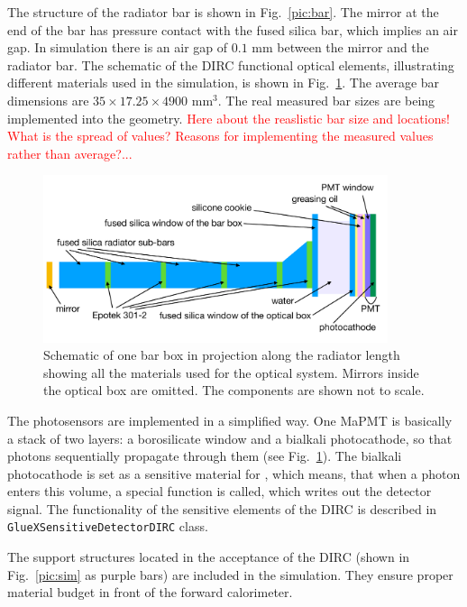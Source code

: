 The structure of the radiator bar is shown in Fig.~\ref{pic:bar}. The mirror at the end of the bar has pressure contact with the fused silica bar, which implies an air gap. In simulation there is an air gap of $0.1$ mm between the mirror and the radiator bar. The schematic of the \gluex DIRC functional optical elements, illustrating different materials used in the simulation, is shown in Fig.~\ref{pic:struct}. 
The average bar dimensions are $35 \times 17.25 \times 4900 $ mm$^3$. The real measured bar sizes are being implemented into the geometry. 
\textcolor{red}{Here about the reaslistic bar size and locations! What is the spread of values? Reasons for implementing the measured values rather than average?...} 

\begin{figure}[!h]
\centering
\includegraphics[angle=0,width=0.9\textwidth]{pics/struct3.pdf}
\caption{\label{pic:struct}
Schematic of one bar box in projection along the radiator length showing all the materials used for the optical system. Mirrors inside the optical box are omitted. The components are shown not to scale.
}
\end{figure}

The photosensors are implemented in a simplified way. One MaPMT is basically a stack of two layers: a borosilicate window and a bialkali photocathode, so that photons sequentially propagate through them (see Fig.~\ref{pic:struct}). The bialkali photocathode is set as a sensitive material for , which means, that when a photon enters this volume, a special function is called, which writes out the detector signal. The functionality of the sensitive elements of the \gluex DIRC is described in \texttt{GlueXSensitiveDetectorDIRC} class.

The support structures located in the acceptance of the DIRC (shown in Fig.~\ref{pic:sim} as purple bars) are included in the simulation. They ensure proper material budget in front of the forward calorimeter.
